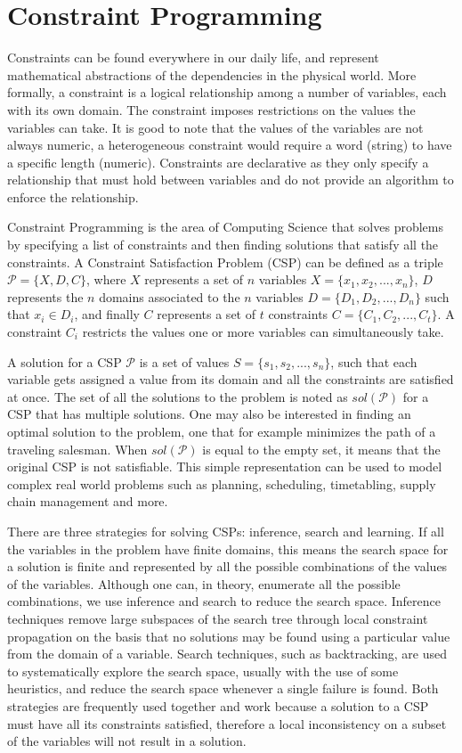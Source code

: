 \documentclass{l4proj}
\begin{document}
\section{Constraint Programming}
\noindent Constraints can be found everywhere in our daily life, and represent mathematical abstractions of the dependencies in the physical world. More formally, a constraint is a logical relationship among a number of variables, each with its own domain. The constraint imposes restrictions on the values the variables can take. It is good to note that the values of the variables are not always numeric, a heterogeneous constraint would require a word (string) to have a specific length (numeric). Constraints are declarative as they only specify a relationship that must hold between variables and do not provide an algorithm to enforce the relationship.

\noindent Constraint Programming is the area of Computing Science that solves problems by specifying a list of constraints and then finding solutions that satisfy all the constraints. A Constraint Satisfaction Problem (CSP) can be defined as a triple $\mathcal{P} = \{X, D, C\}$, where $X$ represents a set of $n$ variables $X = \{x_1, x_2,..., x_n\}$, $D$ represents the $n$ domains associated to the $n$ variables $D = \{D_1, D_2,..., D_n\}$  such that $x_i \in D_i$, and finally $C$ represents a set of $t$ constraints $C =  \{C_1, C_2,..., C_t\}$. A constraint $C_i$ restricts the values one or more variables can simultaneously take.

\noindent A solution for a CSP $\mathcal{P}$ is a set of values $S = \{s_1, s_2,..., s_n\}$, such that each variable gets assigned a value from its domain and all the constraints are satisfied at once. The set of all the solutions to the problem is noted as $sol(\mathcal{P})$ for a CSP that has multiple solutions. One may also be interested in finding an optimal solution to the problem, one that for example minimizes the path of a traveling salesman. When $sol(\mathcal{P})$ is equal to the empty set, it means that the original CSP is not satisfiable. This simple representation can be used to model complex real world problems such as planning, scheduling, timetabling, supply chain management and more.

\noindent There are three strategies for solving CSPs: inference, search and learning. If all the variables in the problem have finite domains, this means the search space for a solution is finite and represented by all the possible combinations of the values of the variables. Although one can, in theory, enumerate all the possible combinations, we use inference and search to reduce the search space. Inference techniques remove large subspaces of the search tree through local constraint propagation on the basis that no solutions may be found using a particular value from the domain of a variable. Search techniques, such as backtracking, are used to systematically explore the search space, usually with the use of some heuristics, and reduce the search space whenever a single failure is found. Both strategies are frequently used together and work because a solution to a CSP must have all its constraints satisfied, therefore a local inconsistency on a subset of the variables will not result in a solution.
\end{document}
